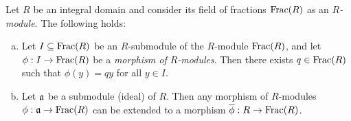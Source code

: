 \begin{lemma}
    \label{lemma:field-of-fractions-lifting-property}
    Let \(R\) be an integral domain and consider its field of fractions
    \(\operatorname{Frac}(R)\) as an \emph{\(R\)-module}. The following holds:
    \begin{enumerate}[(a)]\setlength\itemsep{0em}
        \item Let \(I \subseteq \operatorname{Frac}(R)\) be an \(R\)-submodule of the \(R\)-module
              \(\operatorname{Frac}(R)\), and let \(\phi: I \to \operatorname{Frac}(R)\) be a \emph{morphism of
                  \(R\)-modules}. Then there exists \(q \in \operatorname{Frac}(R)\) such that
              \(\phi(y) = q y\) for all \(y \in I\).

        \item Let \(\mathfrak{a}\) be a submodule (ideal) of \(R\). Then any morphism of
              \(R\)-modules \(\phi: \mathfrak{a} \to \operatorname{Frac}(R)\) can be extended to a morphism
              \(\overline{\phi}: R \to \operatorname{Frac}(R)\).
    \end{enumerate}
\end{lemma}

